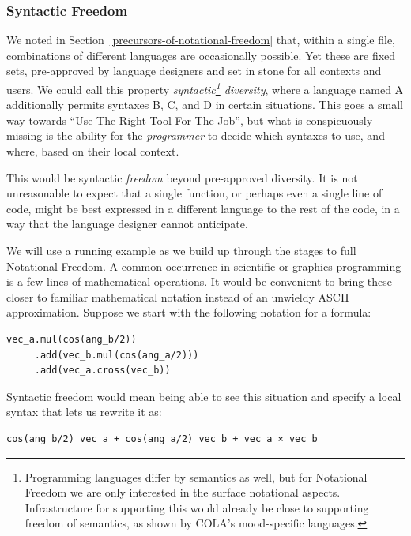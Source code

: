 \documentclass[ twoside,openright,titlepage,numbers=noenddot,headinclude,footinclude,cleardoublepage=empty,abstract=on,
                BCOR=5mm,paper=a4,fontsize=11pt
                ]{scrreprt}
\newcommand{\RTFJ}{Right Tool For The Job}
\newcommand{\URTFJ}{Use The \RTFJ}
\theoremstyle{definition}
\begin{document}
\hypertarget{syntactic-freedom}{\subsubsection{Syntactic Freedom}\label{syntactic-freedom}}

We noted in Section~\ref{precursors-of-notational-freedom} that, within
a single file, combinations of different languages are occasionally
possible. Yet these are fixed sets, pre-approved by language designers
and set in stone for all contexts and users. We could call this property
\emph{syntactic\footnote{Programming languages differ by semantics as
  well, but for Notational Freedom we are only interested in the surface
  notational aspects. Infrastructure for supporting this would already
  be close to supporting freedom of semantics, as shown by \ac{COLA}'s
  mood-specific languages.} diversity}, where a language named A
additionally permits syntaxes B, C, and D in certain situations. This
goes a small way towards ``\URTFJ'', but what is conspicuously missing
is the ability for the \emph{programmer} to decide which syntaxes to
use, and where, based on their local context.

This would be syntactic \emph{freedom} beyond pre-approved diversity. It
is not unreasonable to expect that a single function, or perhaps even a
single line of code, might be best expressed in a different language to
the rest of the code, in a way that the language designer cannot
anticipate.

We will use a running example as we build up through the stages to full
Notational Freedom. A common occurrence in scientific or graphics
programming is a few lines of mathematical operations. It would be
convenient to bring these closer to familiar mathematical notation
instead of an unwieldy ASCII approximation. Suppose we start with the
following notation for a formula:

\begin{verbatim}
vec_a.mul(cos(ang_b/2))
     .add(vec_b.mul(cos(ang_a/2)))
     .add(vec_a.cross(vec_b))
\end{verbatim}

Syntactic freedom would mean being able to see this situation and
specify a local syntax that lets us rewrite it as:

\begin{verbatim}
cos(ang_b/2) vec_a + cos(ang_a/2) vec_b + vec_a × vec_b
\end{verbatim}
\end{document}
